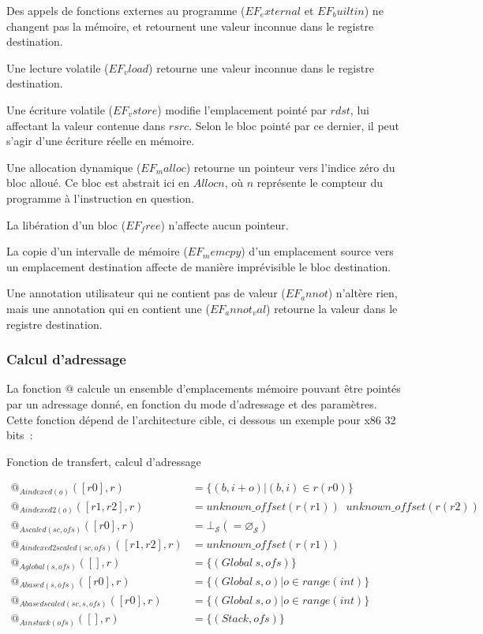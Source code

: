 \documentclass{article}
\makeatletter
\newcommand\mi{\mathit}
\newcommand\At[1]{@_{\mi{#1}}}
\newcommand\foo[1]{$\mi{#1}$}
\newcommand\tS{\mathcal{S}}
\DeclareMathOperator*{\lubS}{{\sqcup}_\tS}
\makeatother
\begin{document}
Des appels de fonctions externes au programme ($EF_external$ et
$EF_builtin$) ne changent pas la mémoire, et retournent une valeur
inconnue dans le registre destination.

Une lecture volatile ($EF_vload$) retourne une valeur inconnue dans
le registre destination.

Une écriture volatile ($EF_vstore$) modifie l'emplacement pointé par
\foo{rdst}, lui affectant la valeur contenue dans \foo{rsrc}. Selon le bloc
pointé par ce dernier, il peut s'agir d'une écriture réelle en mémoire.

Une allocation dynamique ($EF_malloc$) retourne un pointeur vers
l'indice zéro du bloc alloué. Ce bloc est abstrait ici en \foo{Alloc n}, où $n$
représente le compteur du programme à l'instruction en question.

La libération d'un bloc ($EF_free$) n'affecte aucun pointeur.

La copie d'un intervalle de mémoire ($EF_memcpy$) d'un emplacement
source vers un emplacement destination affecte de manière imprévisible le bloc
destination.

Une annotation utilisateur qui ne contient pas de valeur ($EF_annot$)
n'altère rien, mais une annotation qui en contient une
($EF_annot_val$) retourne la valeur dans le registre destination.

\newpage

\subsubsection*{Calcul d'adressage}

La fonction $@$ calcule un ensemble d'emplacements mémoire pouvant
être pointés par un adressage donné, en fonction du mode d'adressage et des
paramètres. Cette fonction dépend de l'architecture cible, ci dessous un
exemple pour x86 32 bits~:

\begin{formulae}
\caption{Fonction de transfert, calcul d'adressage}
\label{transf_addr}
\begin{align*}
\At{Aindexed(o)}([r0], r) &= \{(b, i + o) | (b, i) \in r(r0)\}
\\
\At{Aindexed2(o)}([r1, r2], r) &=
\mi{unknown\_offset}(r(r1)) \lubS \mi{unknown\_offset}(r(r2))
\\
\At{Ascaled(sc, ofs)}([r0], r) &= \bot_\tS (= \varnothing_\tS)
\\
\At{Aindexed2scaled(sc, ofs)}([r1, r2], r) &= \mi{unknown\_offset}(r(r1))
\\
\At{Aglobal(s, ofs)}([], r) &= \{(\mi{Global}\ s, \mi{ofs})\}
\\
\At{Abased(s, ofs)}([r0], r) &= \{(\mi{Global}\ s, o) | o \in \mi{range(int)}\}
\\
\At{Abasedscaled(sc, s, ofs)}([r0], r) &=
\{(\mi{Global}\ s, o) | o \in \mi{range(int)}\}
\\
\At{Ainstack(ofs)}([], r) &= \{(\mi{Stack}, ofs)\}
\end{align*}
\end{formulae}
\end{document}
